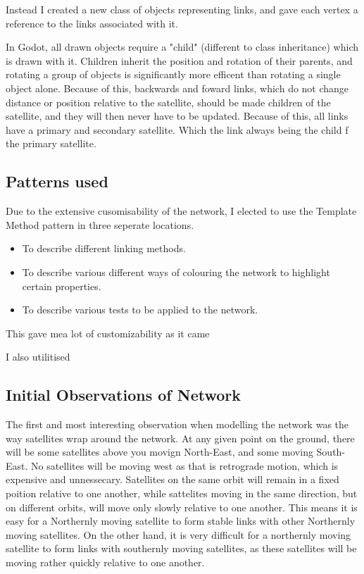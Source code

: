 \documentclass[12pt]{article}
\begin{document}
Instead I created a new class of objects representing links, and gave each vertex a reference to the links associated with it. 

In Godot, all drawn objects require a "child" (different to class inheritance) which is drawn with it. Children inherit the position and rotation of their parents, and rotating a group of objects is significantly more efficent than rotating a single object alone. Because of this, backwards and foward links, which do not change distance or position relative to the satellite, should be made children of the satellite, and they will then never have to be updated. Because of this, all links have a primary and secondary satellite. Which the link always being the child f the primary satellite.

\subsection{Patterns used}

Due to the extensive cusomisability of the network, I elected to use the Template Method pattern in three seperate locations.

\begin{itemize}
\item To describe different linking methods.
\item To describe various different ways of colouring the network to highlight certain properties.
\item To describe various tests to be applied to the network.
\end{itemize}

This gave mea lot of customizability as it came %

I also utilitised

\subsection{Initial Observations of Network}
The first and most interesting observation when modelling the network was the way satellites wrap around the network. At any given point on the ground, there will be some satellites above you movign North-East, and some moving South-East. No satellites will be moving west as that is retrograde motion, which is expensive and unnessecary. Satellites on the same orbit will remain in a fixed poition relative to one another,  while sattelites moving in the same direction, but on different orbits, will move only slowly relative to one another. This means it is easy for a Northernly moving satellite to form stable links with other Northernly moving satellites. On the other hand, it is very difficult for a northernly moving satellite to form links with southernly moving satellites, as these satellites will be moving rather quickly relative to one another.
\end{document}
